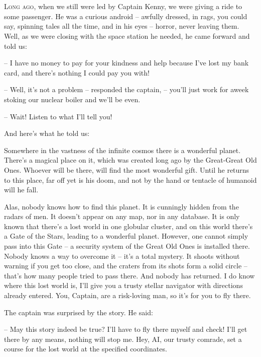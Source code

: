 \documentclass[ebook,twoside,final,openright]{memoir}
\begin{document}
\chapter{}
\par
\lettrine{L}{ong ago,} when we still were led by Captain Kenny, we were giving a ride to some passenger. He was a curious android – awfully dressed, in rags, you could say, spinning tales all the time, and in his eyes – horror, never leaving them. Well, as we were closing with the space station he needed, he came forward and told us: \par
\par
– I have no money to pay for your kindness and help because I’ve lost my bank card, and there’s nothing I could pay you with!\par
– Well, it’s not a problem – responded the captain, – you’ll just work for aweek stoking our nuclear boiler and we’ll be even. \par
– Wait! Listen to what I’ll tell you! \par
 And here’s what he told us:\par
\par
Somewhere in the vastness of the infinite cosmos there is a wonderful planet. There’s a magical place on it, which was created long ago by the Great-Great Old Ones. Whoever will be there, will find the most wonderful gift. Until he returns to this place, far off yet is his doom, and not by the hand or tentacle of humanoid will he fall. \par
Alas, nobody knows how to find this planet. It is cunningly hidden from the radars of men. It doesn’t appear on any map, nor in any database. It is only known that there’s a lost world in one globular cluster, and on this world there’s a Gate of the Stars, leading to a wonderful planet. However, one cannot simply pass into this Gate – a security system of the Great Old Ones is installed there. Nobody knows a way to overcome it – it’s a total mystery. It shoots without warning if you get too close, and the craters from its shots form a solid circle – that's how many people tried to pass there. And nobody has returned. I do know where this lost world is, I'll give you a trusty stellar navigator with directions already entered. You, Captain, are a risk-loving man, so it’s for you to fly there.\par
\par
The captain was surprised by the story. He said:\par
– May this story indeed be true? I’ll have to fly there myself and check! I'll get there by any means, nothing will stop me. Hey, AI, our trusty comrade, set a course for the lost world at the specified coordinates.\par
\end{document}
